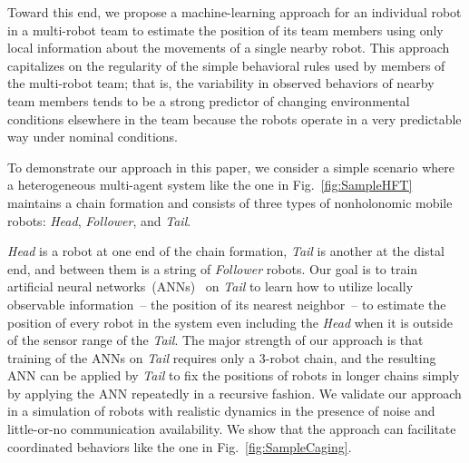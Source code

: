 \documentclass[letterpaper, 10 pt, conference]{ieeeconf}  %
\begin{document}
	Toward this end, we propose a machine-learning approach for an
	individual robot in a multi-robot team to estimate the position of its
	team members using only local information about the movements of a
	single nearby robot. This approach capitalizes on the regularity of the
	simple behavioral rules used by members of the multi-robot team; that
	is, the variability in observed behaviors of nearby team members tends
	to be a strong predictor of changing environmental conditions elsewhere
	in the team because the robots operate in a very predictable way under
	nominal conditions.
	
	To demonstrate our approach in this paper, we consider a simple scenario
	where a heterogeneous multi-agent system like the one in
	Fig.~\ref{fig:SampleHFT} maintains a chain
	formation and consists of three types of nonholonomic mobile robots:
	\emph{Head}, \emph{Follower}, and \emph{Tail}.
	
	\emph{Head} is a robot at one end of the chain formation, \emph{Tail} is
	another at the distal end, and between them is a string of
	\emph{Follower} robots. Our goal is to train artificial neural
	networks~(ANNs)~\cite{Schmidhuber15} on \emph{Tail} to learn how to
	utilize locally observable information~-- the position of its nearest
	neighbor~-- to estimate the position of every robot in the system even
	including the \emph{Head} when it is outside of the sensor range of the
	\emph{Tail}. The major strength of our approach is that training of the
	ANNs on \emph{Tail} requires only a 3-robot chain, and the resulting ANN
	can be applied by \emph{Tail} to fix the positions of robots in longer
	chains simply by applying the ANN repeatedly in a recursive fashion. We
	validate our approach in a simulation of robots with realistic dynamics
	in the presence of noise and little-or-no communication availability. We
	show that the approach can facilitate coordinated behaviors like the
	one in Fig.~\ref{fig:SampleCaging}.
	
\end{document}
